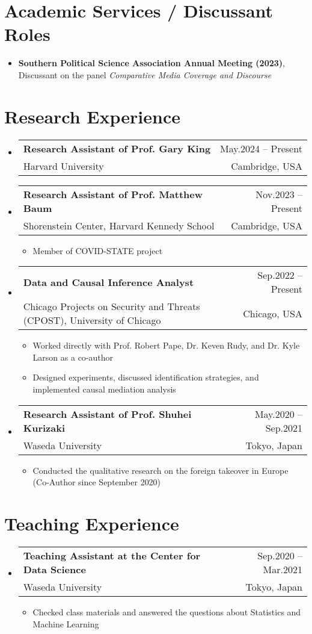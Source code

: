 \documentclass[letterpaper,11pt]{article} %
\makeatletter
\newcommand{\CVItem}[1]{
  \item\small{
    {#1 \vspace{-2pt}}
  }
}
\newcommand{\CVSubheading}[4]{
  \vspace{-2pt}\item
    \begin{tabular*}{0.97\textwidth}[t]{l@{\extracolsep{\fill}}r}
      \textbf{#1} & #2 \\
      \small#3 & \small #4 \\
    \end{tabular*}\vspace{-7pt}
}
\newcommand{\CVSubHeadingListStart}{\begin{itemize}[leftmargin=0.5cm, label={}]}
\newcommand{\CVSubHeadingListEnd}{\end{itemize}}
\newcommand{\CVItemListStart}{\begin{itemize}}
\newcommand{\CVItemListEnd}{\end{itemize}\vspace{-5pt}}
\makeatother
\begin{document}
\section{Academic Services / Discussant Roles}
\begin{itemize}[leftmargin=0.5cm, label={}]
    \item{\textbf{Southern Political Science Association Annual Meeting (2023)}, Discussant on the panel \textit{Comparative Media Coverage and Discourse}}
\end{itemize}

\section{Research Experience}
\CVSubHeadingListStart
\CVSubheading
      {Research Assistant of Prof. Gary King}{May.2024 -- Present}
      {Harvard University}{Cambridge, USA}

\CVSubheading
      {Research Assistant of Prof. Matthew Baum}{Nov.2023 -- Present}
      {Shorenstein Center, Harvard Kennedy School}{Cambridge, USA}
      \CVItemListStart
        \CVItem{Member of COVID-STATE project}
      \CVItemListEnd

\CVSubheading
      {Data and Causal Inference Analyst}{Sep.2022 -- Present}
      {Chicago Projects on Security and Threats (CPOST), University of Chicago}{Chicago, USA}
      \CVItemListStart
        \CVItem{Worked directly with Prof. Robert Pape, Dr. Keven Rudy, and Dr. Kyle Larson as a co-author}
        \CVItem{Designed experiments, discussed identification strategies, and implemented causal mediation analysis}
      \CVItemListEnd

    \CVSubheading
      {Research Assistant of Prof. Shuhei Kurizaki}{May.2020 -- Sep.2021}
      {Waseda University}{Tokyo, Japan}
      \CVItemListStart
        \CVItem{Conducted the qualitative research on the foreign takeover in Europe (Co-Author since September 2020)}
      \CVItemListEnd
\CVSubHeadingListEnd

\section{Teaching Experience}
\CVSubHeadingListStart
    \CVSubheading
      {Teaching Assistant at the Center for Data Science}{Sep.2020 -- Mar.2021}
      {Waseda University}{Tokyo, Japan}
      \CVItemListStart
        \CVItem {Checked class materials and answered the questions about Statistics and Machine Learning}
      \CVItemListEnd
  \CVSubHeadingListEnd
\end{document}
